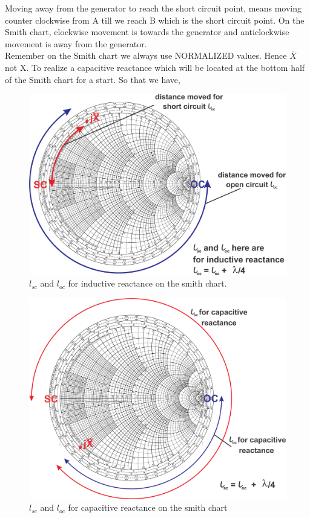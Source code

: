 Moving away from the generator to reach the short circuit point, means moving counter clockwise from A till we reach B which is the short circuit point. On the Smith chart, clockwise movement is towards the generator and anticlockwise movement is away from the generator.\\Remember on the Smith chart we always use NORMALIZED values. Hence $ \overline{X} $ not X. To realize a capacitive reactance which will be located at the bottom half of the Smith chart for a start.
So that we have,
\begin{figure}[h]
\centering
\includegraphics[scale=0.4]{./graphics/group10diagram7}
\caption{$ l_{sc} $ and $ l_{oc} $ for inductive reactance on the smith chart.}
\end{figure}

\begin{figure}[h]
\centering
\includegraphics[scale=0.4]{./graphics/group10diagram8}
\caption{$ l_{sc} $ and $ l_{oc} $ for capacitive reactance on the smith chart}
\end{figure}

